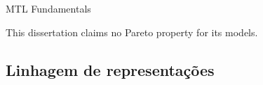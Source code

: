 \documentclass{beamer}
\begin{document}
\begin{frame}{MTL Fundamentals}
    \vspace{0.5mm}
    {\small\alert{This dissertation claims no Pareto property for its models.}\par}
\end{frame}

\subsection{Linhagem de representações}
\end{document}
